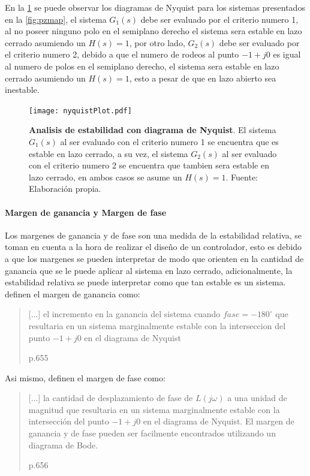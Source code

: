                 En la \cref{fig:nyquistPlot} se puede observar los diagramas de Nyquist para los sistemas presentados en la \cref{fig:pzmap}, el sistema $G_1(s)$ debe ser evaluado por el criterio numero 1, al no poseer ninguno polo en el semiplano derecho el sistema sera estable en lazo cerrado asumiendo un $H(s) = 1$, por otro lado, $G_2(s)$ debe ser evaluado por el criterio numero 2, debido a que el numero de rodeos al punto $-1 + j0$ es igual al numero de polos en el semiplano derecho, el sistema sera estable en lazo cerrado asumiendo un $H(s) = 1$, esto a pesar de que en lazo abierto sea inestable.

                \begin{figure}[htb]
                    \centering
                    \texttt{[image: nyquistPlot.pdf]}
                    \caption[Ejemplo de analisis de estabilidad con diagrama de Nyquist]{\textbf{Analisis de estabilidad con diagrama de Nyquist}. El sistema $G_1(s)$ al ser evaluado con el criterio numero 1 se encuentra que es estable en lazo cerrado, a su vez, el sistema $G_2(s)$ al ser evaluado con el criterio numero 2 se encuentra que tambien sera estable en lazo cerrado, en ambos casos se asume un $H(s) = 1$. Fuente: Elaboración propia.} 
                    \label{fig:nyquistPlot}
                \end{figure}
            
            \paragraph{Margen de ganancia y Margen de fase}
                
                Los margenes de ganancia y de fase son una medida de la estabilidad relativa, se toman en cuenta a la hora de realizar el diseño de un controlador, esto es debido a que los margenes se pueden interpretar de modo que orienten en la cantidad de ganancia que se le puede aplicar al sistema en lazo cerrado, adicionalmente, la estabilidad relativa se puede interpretar como que tan estable es un sistema. \textcite{dorf2011modern} definen el margen de ganancia como: \blockquote[p.655]{[...] el incremento en la ganancia del sistema cuando $fase = -180^\circ$ que resultaria en un sistema marginalmente estable con la interseccion del punto $-1 + j0$ en el diagrama de Nyquist}. Asi mismo, \textcite{dorf2011modern} definen el margen de fase como: \blockquote[p.656]{[...] la cantidad de desplazamiento de fase de $L(j\omega)$ a una unidad de magnitud que resultaria en un sistema marginalmente estable con la intersección del punto $-1 + j0$ en el diagrama de Nyquist. El margen de ganancia y de fase pueden ser facilmente encontrados utilizando un diagrama de Bode.}

